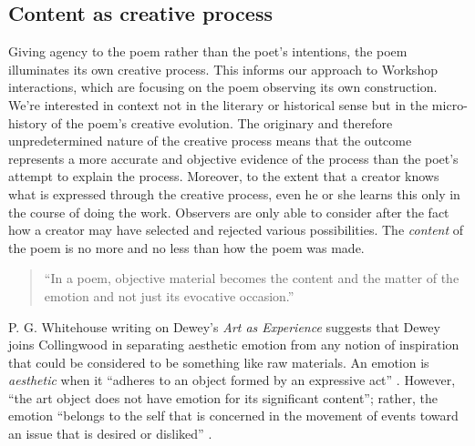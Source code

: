 
\subsection{Content as creative process}
\label{sec:philosophy_and_methods}


Giving agency to the poem rather than the poet's intentions, the poem illuminates its own creative process.  
This informs our approach to Workshop interactions,
which are focusing on the poem observing its own construction.  We're interested
in context not in the literary or historical sense but in the micro-history of the poem's creative evolution.
The originary and therefore unpredetermined nature of
the creative process means that the outcome represents a
more accurate and objective evidence of the process than
the poet's attempt to explain the process. 
Moreover, to the extent that a creator knows what is expressed through the creative process, even he or she learns this only in the course of doing the work.
Observers are only able to consider after the fact how a creator may have selected and rejected various possibilities.   The \emph{content} of the poem is no more and no less than how the poem was made.

\begin{quote}
``In a poem, objective material becomes the content and the matter of the emotion and not
just its evocative occasion.'' 
\end{quote}

P. G. Whitehouse writing on Dewey's \emph{Art as Experience} suggests that Dewey joins
Collingwood in separating aesthetic emotion from any notion of
inspiration that could be considered to be something like raw materials.  
An emotion is
\emph{aesthetic} when it ``adheres to an object formed by an expressive act''
\cite[pp. 149--156]{whitehouse1978meaning}.  However, ``the art
object does not have emotion for its significant content''; rather, the 
emotion
``belongs to the self that is concerned in the movement of events toward an issue that is desired or disliked'' 
\cite[p. 14]{dewey2005art}.%


